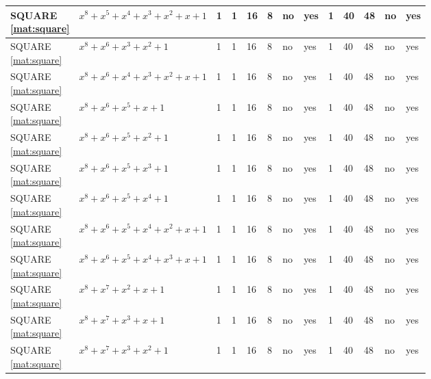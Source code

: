 \begin{tiny}
\begin{longtable}{|l|l|l|l|l|l|l|l|l|l|l|l|l|}
\shortstack{SQUARE \\ \eqref{mat:square}} & $x^8 + x^5 + x^4 + x^3 + x^2 + x + 1$ & 1 & 1 & 16 & 8 & no & yes & 1 & 40 & 48 & no & yes \\ \hline
\shortstack{SQUARE \\ \eqref{mat:square}} & $x^8 + x^6 + x^3 + x^2 + 1$ & 1 & 1 & 16 & 8 & no & yes & 1 & 40 & 48 & no & yes \\ \hline
\shortstack{SQUARE \\ \eqref{mat:square}} & $x^8 + x^6 + x^4 + x^3 + x^2 + x + 1$ & 1 & 1 & 16 & 8 & no & yes & 1 & 40 & 48 & no & yes \\ \hline
\shortstack{SQUARE \\ \eqref{mat:square}} & $x^8 + x^6 + x^5 + x + 1$ & 1 & 1 & 16 & 8 & no & yes & 1 & 40 & 48 & no & yes \\ \hline
\shortstack{SQUARE \\ \eqref{mat:square}} & $x^8 + x^6 + x^5 + x^2 + 1$ & 1 & 1 & 16 & 8 & no & yes & 1 & 40 & 48 & no & yes \\ \hline
\shortstack{SQUARE \\ \eqref{mat:square}} & $x^8 + x^6 + x^5 + x^3 + 1$ & 1 & 1 & 16 & 8 & no & yes & 1 & 40 & 48 & no & yes \\ \hline
\shortstack{SQUARE \\ \eqref{mat:square}} & $x^8 + x^6 + x^5 + x^4 + 1$ & 1 & 1 & 16 & 8 & no & yes & 1 & 40 & 48 & no & yes \\ \hline
\shortstack{SQUARE \\ \eqref{mat:square}} & $x^8 + x^6 + x^5 + x^4 + x^2 + x + 1$ & 1 & 1 & 16 & 8 & no & yes & 1 & 40 & 48 & no & yes \\ \hline
\shortstack{SQUARE \\ \eqref{mat:square}} & $x^8 + x^6 + x^5 + x^4 + x^3 + x + 1$ & 1 & 1 & 16 & 8 & no & yes & 1 & 40 & 48 & no & yes \\ \hline
\shortstack{SQUARE \\ \eqref{mat:square}} & $x^8 + x^7 + x^2 + x + 1$ & 1 & 1 & 16 & 8 & no & yes & 1 & 40 & 48 & no & yes \\ \hline
\shortstack{SQUARE \\ \eqref{mat:square}} & $x^8 + x^7 + x^3 + x + 1$ & 1 & 1 & 16 & 8 & no & yes & 1 & 40 & 48 & no & yes \\ \hline
\shortstack{SQUARE \\ \eqref{mat:square}} & $x^8 + x^7 + x^3 + x^2 + 1$ & 1 & 1 & 16 & 8 & no & yes & 1 & 40 & 48 & no & yes \\ \hline

\end{longtable}
\end{tiny}
